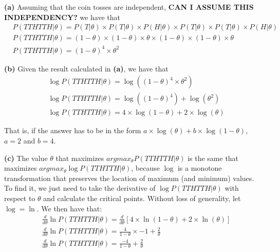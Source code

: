 \documentclass[leqno]{article}
\begin{document}
\noindent \textbf{(a)} Assuming that the coin tosses are independent, \textbf{CAN I ASSUME THIS INDEPENDENCY?}
we have that
\begin{equation*}
\begin{split}
&P(TTHTTH|\theta) = P(T|\theta) \times P(T|\theta) \times P(H|\theta) \times P(T|\theta) \times P(T|\theta) \times P(H|\theta)
\\
&P(TTHTTH|\theta) = (1 - \theta) \times (1 - \theta) \times \theta \times (1 - \theta) \times (1 - \theta) \times \theta
\\
&P(TTHTTH|\theta) = (1 - \theta)^4 \times \theta^2
\end{split}  
\end{equation*}

\hfill

\noindent \textbf{(b)} Given the result calculated in \textbf{(a)}, we have that
\begin{equation*}
\begin{split}
&\log P(TTHTTH|\theta) = \log ((1 - \theta)^4 \times \theta^2)
\\
&\log P(TTHTTH|\theta) = \log ((1 - \theta)^4) + \log (\theta^2)
\\
&\log P(TTHTTH|\theta) = 4 \times \log (1 - \theta) + 2 \times \log (\theta)
\end{split}  
\end{equation*}

\noindent That is, if the answer has to be in the form $a \times \log (\theta) + b \times \log (1 - \theta)$, $a = 2$ and $b = 4$.

\hfill 

\noindent \textbf{(c)} The value $\theta$ that maximizes $argmax_{\theta}P(TTHTTH|\theta)$ is the same that maximizes $argmax_{\theta}\log P(TTHTTH|\theta)$, 
 because $\log$ is a monotone transformation that preserves the location of maximum (and minimum) values. To find it, we just need to take 
 the derivative of $\log P(TTHTTH|\theta)$ with respect to $\theta$ and calculate the critical points. Without loss of generality, let $\log = \ln$. We then have that:
\begin{equation*}
\begin{split}
&\frac{d}{d\theta}\ln P(TTHTTH|\theta) = \frac{d}{d\theta}[4 \times \ln (1 - \theta) + 2 \times \ln (\theta)]
\\
&\frac{d}{d\theta}\ln P(TTHTTH|\theta) = \frac{4}{1 - \theta} \times -1 + \frac{2}{\theta}
\\
&\frac{d}{d\theta}\ln P(TTHTTH|\theta) = \frac{-4}{1 - \theta} + \frac{2}{\theta}
\end{split}  
\end{equation*} 
\end{document}
